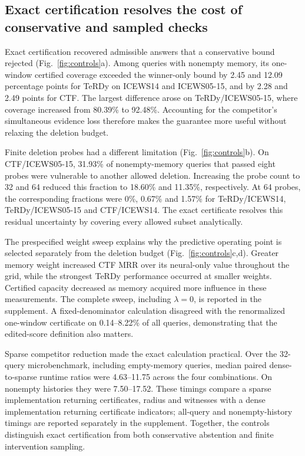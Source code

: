 \subsection{Exact certification resolves the cost of conservative and sampled checks}
Exact certification recovered admissible answers that a conservative bound rejected (Fig.~\ref{fig:controls}a). Among queries with nonempty memory, its one-window certified coverage exceeded the winner-only bound by 2.45 and 12.09 percentage points for TeRDy on ICEWS14 and ICEWS05-15, and by 2.28 and 2.49 points for CTF. The largest difference arose on TeRDy/ICEWS05-15, where coverage increased from 80.39\% to 92.48\%. Accounting for the competitor's simultaneous evidence loss therefore makes the guarantee more useful without relaxing the deletion budget.

Finite deletion probes had a different limitation (Fig.~\ref{fig:controls}b). On CTF/ICEWS05-15, 31.93\% of nonempty-memory queries that passed eight probes were vulnerable to another allowed deletion. Increasing the probe count to 32 and 64 reduced this fraction to 18.60\% and 11.35\%, respectively. At 64 probes, the corresponding fractions were 0\%, 0.67\% and 1.57\% for TeRDy/ICEWS14, TeRDy/ICEWS05-15 and CTF/ICEWS14. The exact certificate resolves this residual uncertainty by covering every allowed subset analytically.

The prespecified weight sweep explains why the predictive operating point is selected separately from the deletion budget (Fig.~\ref{fig:controls}c,d). Greater memory weight increased CTF MRR over its neural-only value throughout the grid, while the strongest TeRDy performance occurred at smaller weights. Certified capacity decreased as memory acquired more influence in these measurements. The complete sweep, including $\lambda=0$, is reported in the supplement. A fixed-denominator calculation disagreed with the renormalized one-window certificate on 0.14--8.22\% of all queries, demonstrating that the edited-score definition also matters.

Sparse competitor reduction made the exact calculation practical. Over the 32-query microbenchmark, including empty-memory queries, median paired dense-to-sparse runtime ratios were 4.63--11.75 across the four combinations. On nonempty histories they were 7.50--17.52. These timings compare a sparse implementation returning certificates, radius and witnesses with a dense implementation returning certificate indicators; all-query and nonempty-history timings are reported separately in the supplement. Together, the controls distinguish exact certification from both conservative abstention and finite intervention sampling.

